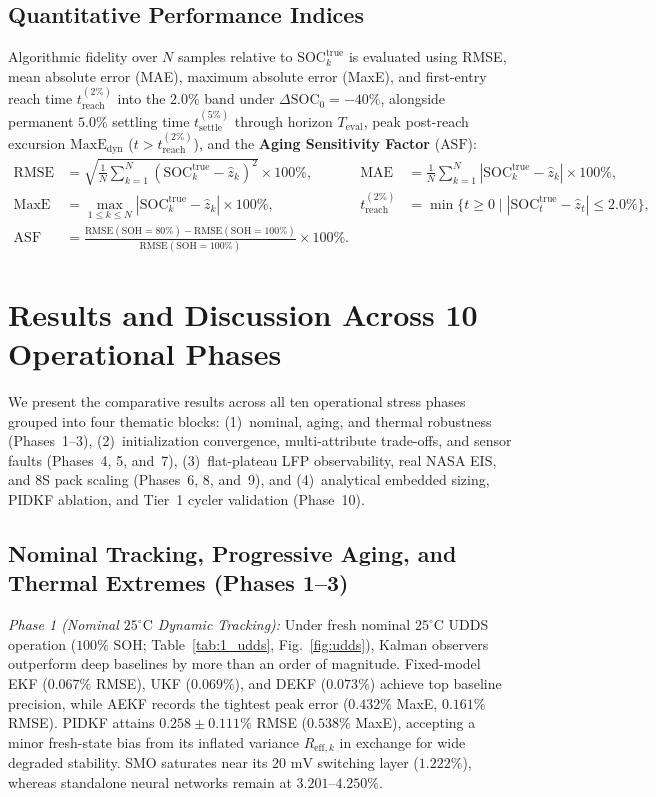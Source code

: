 \documentclass[10pt,a4paper]{article}
\begin{document}
\subsection{Quantitative Performance Indices}
Algorithmic fidelity over $N$ samples relative to $\text{SOC}_k^{\text{true}}$ is evaluated using RMSE, mean absolute error (MAE), maximum absolute error (MaxE), and first-entry reach time $t_{\text{reach}}^{(2\%)}$ into the $2.0\%$ band under $\Delta\text{SOC}_0 = -40\%$, alongside permanent $5.0\%$ settling time $t_{\text{settle}}^{(5\%)}$ through horizon $T_{\text{eval}}$, peak post-reach excursion $\text{MaxE}_{\text{dyn}}$ ($t > t_{\text{reach}}^{(2\%)}$), and the \textbf{Aging Sensitivity Factor} ($\text{ASF}$):
\begin{align}
\text{RMSE} &= \sqrt{\tfrac{1}{N}\textstyle\sum_{k=1}^N (\text{SOC}_k^{\text{true}} - \hat{z}_k)^2} \times 100\%, &
\text{MAE} &= \tfrac{1}{N}\textstyle\sum_{k=1}^N |\text{SOC}_k^{\text{true}} - \hat{z}_k| \times 100\%, \label{eqn:mae}\\
\text{MaxE} &= \max_{1 \le k \le N} |\text{SOC}_k^{\text{true}} - \hat{z}_k| \times 100\%, &
t_{\text{reach}}^{(2\%)} &= \min\{ t \ge 0 \mid |\text{SOC}_t^{\text{true}} - \hat{z}_t| \le 2.0\% \}, \label{eqn:treach}\\
\text{ASF} &= \frac{\text{RMSE}(\text{SOH}=80\%) - \text{RMSE}(\text{SOH}=100\%)}{\text{RMSE}(\text{SOH}=100\%)} \times 100\%. \label{eqn:asf}
\end{align}

\section{Results and Discussion Across 10 Operational Phases}
We present the comparative results across all ten operational stress phases grouped into four thematic blocks: (1)~nominal, aging, and thermal robustness (Phases~1--3), (2)~initialization convergence, multi-attribute trade-offs, and sensor faults (Phases~4, 5, and~7), (3)~flat-plateau LFP observability, real NASA EIS, and 8S pack scaling (Phases~6, 8, and~9), and (4)~analytical embedded sizing, PIDKF ablation, and Tier~1 cycler validation (Phase~10).

\subsection{Nominal Tracking, Progressive Aging, and Thermal Extremes (Phases 1--3)}
\emph{Phase 1 (Nominal $25^\circ\text{C}$ Dynamic Tracking):} Under fresh nominal $25^\circ\text{C}$ UDDS operation ($100\%$ SOH; Table~\ref{tab:1_udds}, Fig.~\ref{fig:udds}), Kalman observers outperform deep baselines by more than an order of magnitude. Fixed-model EKF ($0.067\%$ RMSE), UKF ($0.069\%$), and DEKF ($0.073\%$) achieve top baseline precision, while AEKF records the tightest peak error ($0.432\%$ MaxE, $0.161\%$ RMSE). PIDKF attains $0.258\pm0.111\%$ RMSE ($0.538\%$ MaxE), accepting a minor fresh-state bias from its inflated variance $R_{\text{eff},k}$ in exchange for wide degraded stability. SMO saturates near its $20\text{ mV}$ switching layer ($1.222\%$), whereas standalone neural networks remain at $3.201\text{--}4.250\%$.
\end{document}
